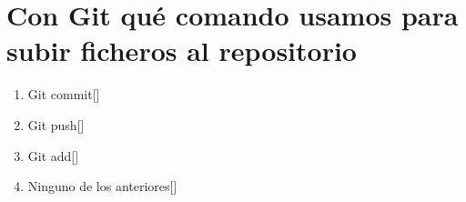 \documentclass[addpoints, 12]{exam}{article}
\begin{document}
\section{Con Git qué comando usamos para subir ficheros al repositorio}
\label{sec:org1738d50}
\begin{enumerate}
\item Git commit[]
\item Git push[]
\item Git add[]
\item Ninguno de los anteriores[]
\end{enumerate}
\end{document}
